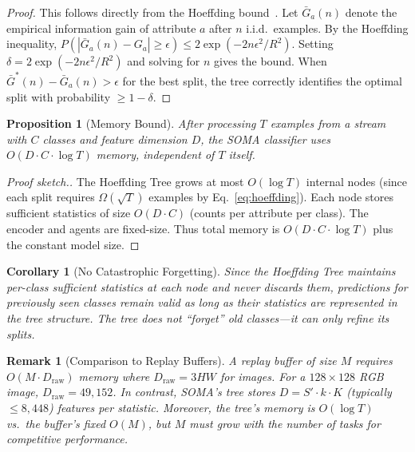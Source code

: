 \documentclass{article}
\newtheorem{corollary}[theorem]{Corollary}
\newtheorem{proposition}[theorem]{Proposition}
\newtheorem{remark}{Remark}
\begin{document}
\begin{proof}
This follows directly from the Hoeffding bound~\citep{hoeffding1963probability}. Let $\bar{G}_a(n)$ denote the empirical information gain of attribute $a$ after $n$ i.i.d.\ examples.
By the Hoeffding inequality, $P(|\bar{G}_a(n) - G_a| \geq \epsilon) \leq 2\exp(-2n\epsilon^2/R^2)$.
Setting $\delta = 2\exp(-2n\epsilon^2/R^2)$ and solving for $n$ gives the bound.
When $\bar{G}^*(n) - \bar{G}_a(n) > \epsilon$ for the best split, the tree correctly identifies the optimal split with probability $\geq 1-\delta$.
\end{proof}

\begin{proposition}[Memory Bound]
\label{prop:memory}
After processing $T$ examples from a stream with $C$ classes and feature dimension $D$, the SOMA classifier uses $O(D \cdot C \cdot \log T)$ memory, independent of $T$ itself.
\end{proposition}

\begin{proof}[Proof sketch.]
The Hoeffding Tree grows at most $O(\log T)$ internal nodes (since each split requires $\Omega(\sqrt{T})$ examples by Eq.~\ref{eq:hoeffding}). Each node stores sufficient statistics of size $O(D \cdot C)$ (counts per attribute per class). The encoder and agents are fixed-size. Thus total memory is $O(D \cdot C \cdot \log T)$ plus the constant model size.
\end{proof}

\begin{corollary}[No Catastrophic Forgetting]
Since the Hoeffding Tree maintains per-class sufficient statistics at each node and never discards them, predictions for previously seen classes remain valid as long as their statistics are represented in the tree structure. The tree does not ``forget'' old classes---it can only refine its splits.
\end{corollary}

\begin{remark}[Comparison to Replay Buffers]
A replay buffer of size $M$ requires $O(M \cdot D_\text{raw})$ memory where $D_\text{raw} = 3HW$ for images. For a $128\times128$ RGB image, $D_\text{raw} = 49{,}152$. In contrast, SOMA's tree stores $D = S' \cdot k \cdot K$ (typically $\leq 8{,}448$) features per statistic. Moreover, the tree's memory is $O(\log T)$ vs.\ the buffer's fixed $O(M)$, but $M$ must grow with the number of tasks for competitive performance.
\end{remark}
\end{document}
